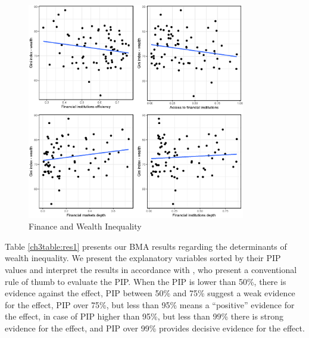 \begin{refsection}
\begin{figure}[ht]
	\caption{Finance and Wealth Inequality}
    \label{ch3fig:findev}
    \begin{measuredfigure}
    \centering
	\includegraphics[width=0.85\textwidth, keepaspectratio]{figures/ch3/plots_findev.eps}
	\end{measuredfigure}
\end{figure}

Table \ref{ch3table:res1} presents our \ac{BMA} results regarding the determinants of wealth inequality. We present the explanatory variables sorted by their \ac{PIP} values and interpret the results in accordance with \textcite{kass1995bayes}, who present a conventional rule of thumb to evaluate the \ac{PIP}. When the \ac{PIP} is lower than 50\%, there is evidence against the effect, \ac{PIP} between 50\% and 75\% suggest a weak evidence for the effect, \ac{PIP} over 75\%, but less than 95\% means a “positive” evidence for the effect, in case of \ac{PIP} higher than 95\%, but less than 99\% there is strong evidence for the effect, and \ac{PIP} over 99\% provides decisive evidence for the effect.


\end{refsection}
